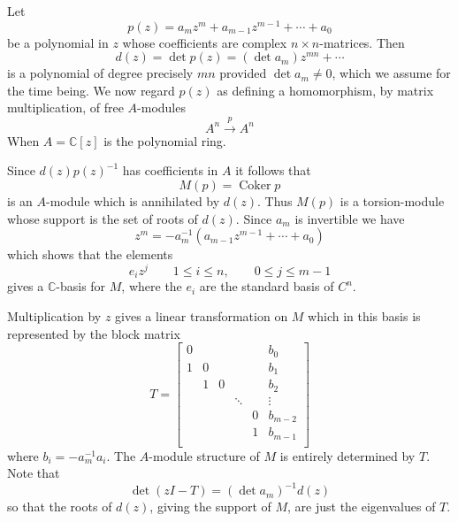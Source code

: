 \documentclass[leqno]{book}
\numberwithin{equation}{section}
\theoremstyle{definition}
\begin{document}
            Let
            \begin{equation*}
              p(z)=a_{m}z^{m}+a_{m-1}z^{m-1}+ \cdots +a_0
            \end{equation*}
            be a polynomial in $z$ whose coefficients are complex $n\times n$-matrices. Then
            \begin{equation*}
              d(z)=\det p(z)=(\det a_{m})z^{mn}+ \cdots 
            \end{equation*}
            is a polynomial of degree precisely $mn$ provided $\det a_{m}\neq 0$, which we assume for the time being. We now regard $p(z)$ as defining a homomorphism, by matrix multiplication, of free $A$-modules
            \begin{equation*}
              A^{n}\stackrel{p}{\rightarrow} A^{n}
            \end{equation*}
            When $A=\mathbb{C}[z]$ is the polynomial ring.

            Since $d(z)p(z)^{-1}$ has coefficients in $A$ it follows that
            \begin{equation*}
              M(p)=\operatorname{Coker}p 
            \end{equation*}
            is an $A$-module which is annihilated by $d(z)$. Thus $M(p)$ is a torsion-module whose support is the set of roots of $d(z)$. Since $a_{m}$ is invertible we have
            \begin{equation*}
              z^{m}=-a_{m}^{-1}(a_{m-1}z^{m-1}+ \cdots +a_0)
            \end{equation*}
            which shows that the elements
            \begin{equation*}
              e_{i}z^{j} \qquad 1\le i\le n, \qquad 0\le j\le m-1
            \end{equation*}
            gives a $\mathbb{C}$-basis for $M$, where the $e_{i}$ are the standard basis of $C^{n}$.

            Multiplication by $z$ gives a linear transformation on $M$ which in this basis is represented by the block matrix
            \begin{equation*}
              T=
              \left[ \begin{array}{cccccc}
                0&		&		&		&		&		b_0\\
                1&		0&		&		&		&		b_1\\
                &		1&		0&		&		&		b_2\\
                &		&		&		\ddots&		&		\vdots\\
                &		&		&		&		0&		b_{m-2}\\
                &		&		&		&		1&		b_{m-1}\\
              \end{array} \right] 
            \end{equation*}
            where $b_{i}=-a_{m}^{-1}a_{i}$. The $A$-module structure of $M$ is entirely determined by $T$. Note that
            \begin{equation*}
              \det (zI-T)=(\det a_{m})^{-1}d(z)
            \end{equation*}
            so that the roots of $d(z)$, giving the support of $M$, are just the eigenvalues of $T$.
\end{document}

